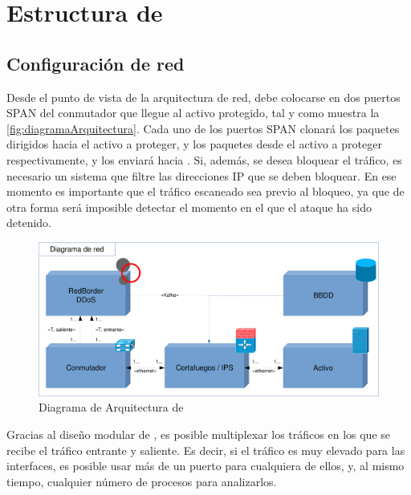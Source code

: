 \section{Estructura de \redborderddos}
\subsection{Configuración de red}\label{ssec:estructura_red}
Desde el punto de vista de la arquitectura de red, \redborderddos{} debe colocarse en dos puertos SPAN del conmutador que llegue al activo protegido, tal y como muestra la \autoref{fig:diagramaArquitectura}. Cada uno de los 
puertos SPAN clonará los paquetes dirigidos hacia el activo a proteger, y los paquetes desde el activo a proteger 
respectivamente, y los enviará hacia \redborderddos. %
Si, además, se desea bloquear el tráfico, es necesario
un sistema que filtre las direcciones IP que se deben bloquear. 
En ese momento es importante que el tráfico escaneado sea
previo al bloqueo, ya que de otra forma será imposible detectar el momento en el que el ataque ha sido detenido. %

\begin{figure}[htbp]
\centering
\includegraphics[width=\columnwidth]{CapituloEstructura/Figuras/DiagramaArquitectura-crop}
\caption{Diagrama de Arquitectura de \redborderddos}
\label{fig:diagramaArquitectura}
\end{figure}
%

Gracias al diseño modular de \redborderddos, es posible multiplexar los tráficos en los
que se recibe el tráfico entrante y saliente. Es decir, si el tráfico es muy elevado para
las interfaces, es posible usar más de un puerto para cualquiera de ellos, y, al mismo tiempo,
cualquier número de procesos para analizarlos.

